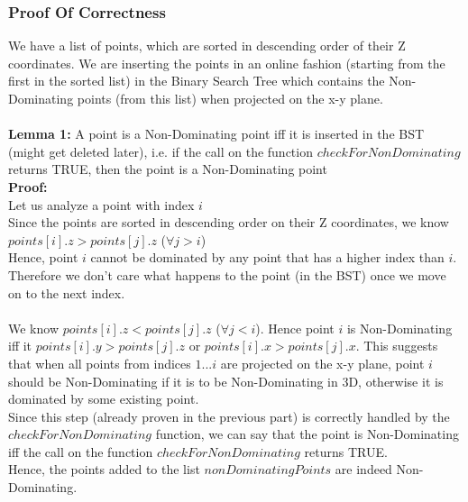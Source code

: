 \documentclass{article}
\begin{document}
            \subsubsection*{Proof Of Correctness}
                
                We have a list of points, which are sorted in descending order of their Z coordinates. We are inserting the points in an online fashion (starting from the first in the sorted list) in the Binary Search Tree which contains the Non-Dominating points (from this list) when projected on the x-y plane.
                \\
                \\
                \textbf{Lemma 1:} A point is a Non-Dominating point iff it is inserted in the BST (might get deleted later), i.e. if the call on the function $checkForNonDominating$ returns TRUE, then the point is a Non-Dominating point
                \\
                \textbf{Proof:}
                \\
                Let us analyze a point with index $i$
                \\
                Since the points are sorted in descending order on their Z coordinates, we know $points[i].z > points[j].z$ ($\forall j > i$)
                \\
                Hence, point $i$ cannot be dominated by any point that has a higher index than $i$. Therefore we don't care what happens to the point (in the BST) once we move on to the next index.
                \\
                \\
                We know $points[i].z < points[j].z$ ($\forall j < i$). Hence point $i$ is Non-Dominating iff it $points[i].y > points[j].z$ or $points[i].x > points[j].x$. This suggests that when all points from indices $1...i$ are projected on the x-y plane, point $i$ should be Non-Dominating if it is to be Non-Dominating in 3D, otherwise it is dominated by some existing point.
                \\
                Since this step (already proven in the previous part) is correctly handled by the $checkForNonDominating$ function, we can say that the point is Non-Dominating iff the call on the function $checkForNonDominating$ returns TRUE.
                \\
                Hence, the points added to the list $nonDominatingPoints$ are indeed Non-Dominating.
                
\end{document}
